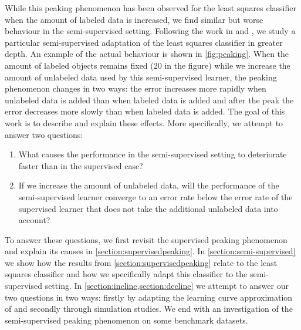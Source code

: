 \documentclass[twoside]{memoir}\usepackage[]{graphicx}\usepackage{xcolor}
\begin{document}
While this peaking phenomenon has been observed for the least squares classifier when the amount of labeled data is increased, we find similar but worse behaviour in the semi-supervised setting.  Following the work in \citet{Duin1995} and \citet{Fan2008}, we study a particular semi-supervised adaptation of the least squares classifier in greater depth. An example of the actual behaviour is shown in \cref{fig:peaking}. When the amount of labeled objects remains fixed ($20$ in the figure) while we increase the amount of unlabeled data used by this semi-supervised learner, the peaking phenomenon changes in two ways: the error increases more rapidly when unlabeled data is added than when labeled data is added and after the peak the error decreases more slowly than when labeled data is added. The goal of this work is to describe and explain these effects. More specifically, we attempt to answer two questions:
\begin{enumerate}
\item What causes the performance in the semi-supervised setting to deteriorate faster than in the supervised case?
\item If we increase the amount of unlabeled data, will the performance of the semi-supervised learner converge to an error rate below the error rate of the supervised learner that does not take the additional unlabeled data into account?
\end{enumerate}
To answer these questions, we first revisit the supervised peaking phenomenon and explain its causes in \cref{section:supervisedpeaking}. In \cref{section:semi-supervised} we show how the results from \cref{section:supervisedpeaking} relate to the least squares classifier and how we specifically adapt this classifier to the semi-supervised setting. In \cref{section:incline,section:decline} we attempt to answer our two questions in two ways: firstly by adapting the learning curve approximation of \citet{Raudys1998} and secondly through simulation studies. We end with an investigation of the semi-supervised peaking phenomenon on some benchmark datasets.
\end{document}
